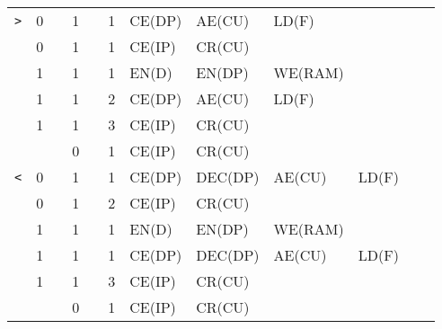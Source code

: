 \begin{landscape}
\begin{longtable}[c] {c|cccc|c|llllll}
    \rowcolor{Gray}  \texttt{>}   & 0 &   & 1     &      & 1     & CE(DP)   & AE(CU)   & LD(F)   &        &        &        \\
    \rowcolor{Gray}               & 0 &   & 1     &      & 1     & CE(IP)   & CR(CU)   &         &        &        &        \\
    \rowcolor{White}              & 1 &   & 1     &      & 1     & EN(D)    & EN(DP)   & WE(RAM) &        &        &        \\
    \rowcolor{White}              & 1 &   & 1     &      & 2     & CE(DP)   & AE(CU)   & LD(F)   &        &        &        \\
    \rowcolor{White}              & 1 &   & 1     &      & 3     & CE(IP)   & CR(CU)   &         &        &        &        \\
    \rowcolor{Gray}               &   &   & 0     &      & 1     & CE(IP)   & CR(CU)   &         &        &        &        \\ \hline
    
    \rowcolor{White} \texttt{<}   & 0 &   & 1     &      & 1     & CE(DP)   & DEC(DP)  & AE(CU)  & LD(F)  &        &        \\
    \rowcolor{White}              & 0 &   & 1     &      & 2     & CE(IP)   & CR(CU)   &         &        &        &        \\
    \rowcolor{Gray}               & 1 &   & 1     &      & 1     & EN(D)    & EN(DP)   & WE(RAM) &        &        &        \\
    \rowcolor{Gray}               & 1 &   & 1     &      & 1     & CE(DP)   & DEC(DP)  & AE(CU)  & LD(F)  &        &        \\
    \rowcolor{Gray}               & 1 &   & 1     &      & 3     & CE(IP)   & CR(CU)   &         &        &        &        \\
    \rowcolor{White}              &   &   & 0     &      & 1     & CE(IP)   & CR(CU)   &         &        &        &        \\ \hline
    

\end{longtable}
\end{landscape}
